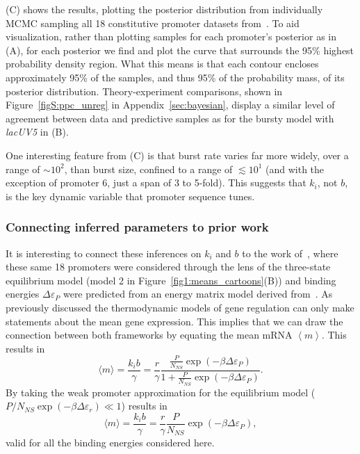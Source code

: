 (C) shows the results, plotting the posterior
distribution from individually MCMC sampling all 18 constitutive promoter
datasets from~\cite{Jones2014}. To aid visualization, rather than plotting
samples for each promoter's posterior as in (A), for
each posterior we find and plot the curve that surrounds the 95\% highest
probability density region. What this means is that each contour 
encloses approximately 95\% of the samples, and thus 95\% of the probability
mass, of its posterior distribution. Theory-experiment comparisons,
shown in Figure~\ref{figS:ppc_unreg} in Appendix~\ref{sec:bayesian},
display a similar level of agreement between data and predictive samples as for
the bursty model with \textit{lacUV5} in (B).

One interesting feature from (C) is that burst rate
varies far more widely, over a range of $\sim10^2$, than burst size, confined to
a range of $\lesssim10^1$ (and with the exception of promoter 6, just a span of
3 to 5-fold). This suggests that $k_i$, not $b$, is the key dynamic variable that
promoter sequence tunes.

\subsubsection{Connecting inferred parameters to prior work}
It is interesting to connect these inferences on $k_i$ and $b$ to the work
of~\cite{Brewster2012}, where these same 18 promoters were considered through
the lens of the three-state equilibrium model (model 2 in
Figure~\ref{fig1:means_cartoons}(B)) and binding energies $\Delta\varepsilon_P$
were predicted from an energy matrix model derived from~\cite{Kinney2010}. As
previously discussed the thermodynamic models of gene regulation can only make
statements about the mean gene expression. This implies that we can draw the
connection between both frameworks by equating the mean mRNA $\left\langle m
\right\rangle$. This results in
\begin{equation}
\langle m \rangle = \frac{k_i b}{\gamma}
        = \frac{r}{\gamma}
        \frac{\frac{P}{N_{NS}}\exp(-\beta\Delta\varepsilon_P)}
                {1+\frac{P}{N_{NS}}\exp(-\beta\Delta\varepsilon_P)}.
\end{equation}
By taking the weak promoter approximation for the equilibrium model ($P/N_{NS} 
\exp(-\beta\Delta\varepsilon_r) \ll 1$) results in
\begin{equation}
\langle m \rangle = \frac{k_i b}{\gamma}
        = \frac{r}{\gamma} \frac{P}{N_{NS}}\exp(-\beta\Delta\varepsilon_P),
\end{equation}
valid for all the binding energies considered here.

